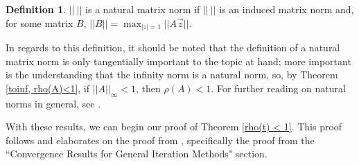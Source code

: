 \documentclass[12pt,letterpaper]{article}
\theoremstyle{definition}
\newtheorem{defn}[thm]{Definition}
\begin{document}
\begin{defn}
$||\medspace||$ is a natural matrix norm if $||\medspace||$ is an induced matrix norm and, for some matrix $B$, $||B|| = \max_{|z| = 1}||A\vec{z}||$.
\end{defn}

In regards to this definition, it should be noted that the definition of a natural matrix norm is only tangentially important to the topic at hand; more important is the understanding that the infinity norm is a natural norm, so, by Theorem \ref{toinf, rho(A)<1}, if $||A||_\infty<1$, then $\rho{(A)}<1$. For further reading on natural norms in general, see \cite{Natural_Norms}.




With these results, we can begin our proof of Theorem \ref{rho(t) < 1}. This proof follows and elaborates on the proof from \cite{Burden}, specifically the proof from the ``Convergence Results for General Iteration Methods" section.
\end{document}
